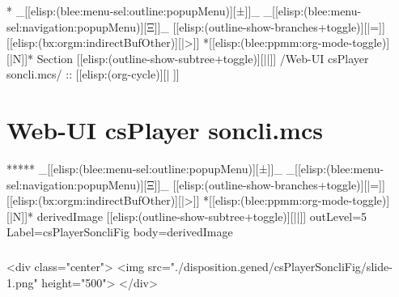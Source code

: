 \begin{whenOrg}
*  _[[elisp:(blee:menu-sel:outline:popupMenu)][±]]_ _[[elisp:(blee:menu-sel:navigation:popupMenu)][Ξ]]_ [[elisp:(outline-show-branches+toggle)][|=]] [[elisp:(bx:orgm:indirectBufOther)][|>]] *[[elisp:(blee:ppmm:org-mode-toggle)][|N]]*  Section    [[elisp:(outline-show-subtree+toggle)][||]]   /Web-UI csPlayer soncli.mcs/ ::  [[elisp:(org-cycle)][| ]]
\end{whenOrg}

\section{Web-UI csPlayer soncli.mcs}

\begin{whenOrg}
*****  _[[elisp:(blee:menu-sel:outline:popupMenu)][±]]_ _[[elisp:(blee:menu-sel:navigation:popupMenu)][Ξ]]_ [[elisp:(outline-show-branches+toggle)][|=]] [[elisp:(bx:orgm:indirectBufOther)][|>]] *[[elisp:(blee:ppmm:org-mode-toggle)][|N]]*  derivedImage [[elisp:(outline-show-subtree+toggle)][||]] outLevel=5 Label=csPlayerSoncliFig  body=derivedImage
\end{whenOrg}

\begin{htmlonly}

\begin{frame}[fragile,plain,label=csPlayerSoncliFig]
    \frametitle{}
    \framesubtitle{}
    \begin{rawhtml}
<div class="center">
<img src="./disposition.gened/csPlayerSoncliFig/slide-1.png" height="500">
</div>
    \end{rawhtml}
\end{frame}
\end{htmlonly}

